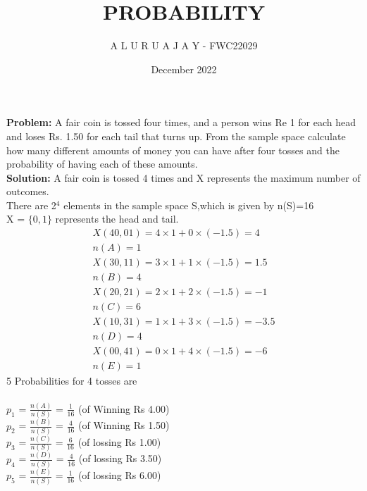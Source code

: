 \documentclass{article}
\newcommand{\Problem}{\noindent \textbf{Problem: }}
\newcommand{\solution}{\noindent \textbf{Solution: }}
\begin{document}
\title{\textbf{PROBABILITY}}
\author{A L U R U A J A Y - FWC22029}
\date{December 2022}


\maketitle

\Problem A fair coin is tossed four times, and a person wins Re 1 for each head and loses Rs. 1.50 for each tail that turns up. From the sample space calculate how many different amounts of money you can have after four tosses and the probability of having each of these amounts.\\

\solution
A fair coin is tossed 4 times and X represents the maximum number of outcomes.\\
There are 2$^4$ elements in the sample space S,which is given by
n(S)=16\\
X = $\{0,1\}$ represents the head and tail.
\begin{align}
X(40,01) = 4\times1 + 0\times(-1.5) = 4\\
n(A) = 1\\
X(30,11) = 3\times1 + 1\times(-1.5) = 1.5\\
n(B) = 4\\
X(20,21) = 2\times1 + 2\times(-1.5) = -1\\
n(C) = 6\\
X(10,31) = 1\times1 + 3\times(-1.5) = -3.5\\
n(D) = 4\\
X(00,41) =0\times1 + 4\times(-1.5) = -6\\
n(E) = 1
\end{align}
5 Probabilities for 4 tosses are\\
\vspace{0.1cm}\\
$p_1$ = $\frac{n(A)}{n(S)}$ = $\frac{1}{16}$ (of Winning Rs 4.00)
\vspace{0.2cm}\\
$p_2$ = $\frac{n(B)}{n(S)}$ = $\frac{4}{16}$ (of Winning Rs 1.50)
\vspace{0.2cm}\\
$p_3$ = $\frac{n(C)}{n(S)}$ = $\frac{6}{16}$ (of lossing Rs 1.00)
\vspace{0.2cm}\\
$p_4$ = $\frac{n(D)}{n(S)}$ = $\frac{4}{16}$ (of lossing Rs 3.50)
\vspace{0.2cm}\\
$p_5$ = $\frac{n(E)}{n(S)}$ = $\frac{1}{16}$ (of lossing Rs 6.00)
\end{document}
